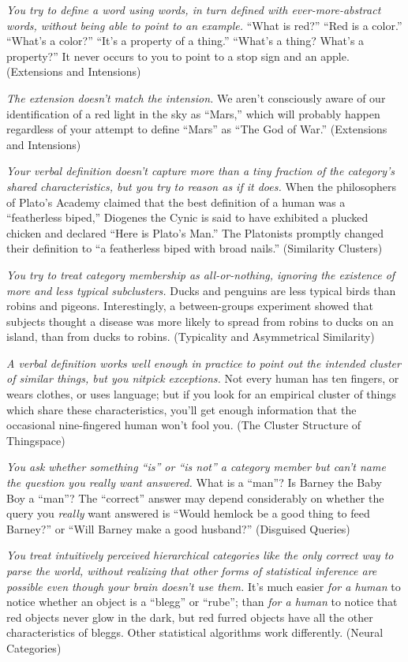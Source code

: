 {
 \textit{You try to define a word using words, in turn defined with
ever-more-abstract words, without being able to point to an example.}
``What is red?''
``Red is a color.''
``What's a color?''
``It's a property of a
thing.'' ``What's a
thing? What's a property?'' It never
occurs to you to point to a stop sign and an apple. (Extensions and
Intensions)}

{
 \textit{The extension doesn't match the
intension.} We aren't consciously aware of our
identification of a red light in the sky as
``Mars,'' which will probably happen
regardless of your attempt to define
``Mars'' as ``The
God of War.'' (Extensions and Intensions)}

{
 \textit{Your verbal definition doesn't capture
more than a tiny fraction of the category's shared
characteristics, but you try to reason as if it does.} When the
philosophers of Plato's Academy claimed that the best
definition of a human was a ``featherless
biped,'' Diogenes the Cynic is said to have exhibited
a plucked chicken and declared ``Here is
Plato's Man.'' The Platonists
promptly changed their definition to ``a featherless
biped with broad nails.'' (Similarity Clusters)}

{
 \textit{You try to treat category membership as all-or-nothing,
ignoring the existence of more and less typical subclusters.} Ducks and
penguins are less typical birds than robins and pigeons. Interestingly,
a between-groups experiment showed that subjects thought a disease was
more likely to spread from robins to ducks on an island, than from
ducks to robins. (Typicality and Asymmetrical Similarity)}

{
 \textit{A verbal definition works well enough in practice to point
out the intended cluster of similar things, but you nitpick
exceptions.} Not every human has ten fingers, or wears clothes, or uses
language; but if you look for an empirical cluster of things which
share these characteristics, you'll get enough
information that the occasional nine-fingered human
won't fool you. (The Cluster Structure of Thingspace)}

{
 \textit{You ask whether something
``is'' or ``is
not'' a category member but can't
name the question you really want answered.} What is a
``man''? Is Barney the Baby Boy a
``man''? The
``correct'' answer may depend
considerably on whether the query you \textit{really} want answered is
``Would hemlock be a good thing to feed
Barney?'' or ``Will Barney make a
good husband?'' (Disguised Queries)}

{
 \textit{You treat intuitively perceived hierarchical categories
like the only correct way to parse the world, without realizing that
other forms of statistical inference are possible even though your
brain doesn't use them.} It's much
easier \textit{for a human} to notice whether an object is a
``blegg'' or
``rube''; than \textit{for a human}
to notice that red objects never glow in the dark, but red furred
objects have all the other characteristics of bleggs. Other statistical
algorithms work differently. (Neural Categories)}

